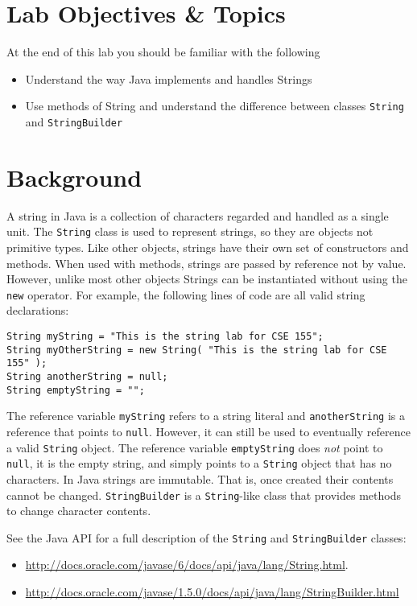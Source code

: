 \documentclass[12pt]{scrartcl}
\begin{document}
\section{Lab Objectives \& Topics}
At the end of this lab you should be familiar with the following
\begin{itemize}
  \item Understand the way Java implements and handles Strings
  \item Use methods of String and understand the difference between 
  	classes \texttt{String} and \texttt{StringBuilder}
\end{itemize}

\section{Background}

A string in Java is a collection of characters regarded and handled as 
a single unit.  The \texttt{String} class is used to represent 
strings, so they are objects not primitive types.  Like other objects, 
strings have their own set of constructors and methods.  When used
with methods, strings are passed by reference not by value.  However, 
unlike most other objects Strings can be instantiated without using 
the \texttt{new} operator.  For example, the following lines of 
code are all valid string declarations:

\begin{verbatim}
String myString = "This is the string lab for CSE 155";
String myOtherString = new String( "This is the string lab for CSE 155" );
String anotherString = null;
String emptyString = "";
\end{verbatim}

The reference variable \texttt{myString} refers to a string literal 
and \texttt{anotherString} is a reference that points to \texttt{null}.
However, it can still be used to eventually reference a valid \texttt{String}
object.  The reference variable \texttt{emptyString} does 
\emph{not} point to \texttt{null}, it is the empty string, and simply 
points to a \texttt{String} object that has no characters.  In Java 
strings are immutable.  That is, once created their contents cannot be changed.  
\texttt{StringBuilder} is a \texttt{String}-like class that 
provides methods to change character contents.

See the Java API for a full description of the \texttt{String} 
and \texttt{StringBuilder} classes: 
\begin{itemize}
  \item \url{http://docs.oracle.com/javase/6/docs/api/java/lang/String.html}.
  \item \url{http://docs.oracle.com/javase/1.5.0/docs/api/java/lang/StringBuilder.html}
\end{itemize}
\end{document}
